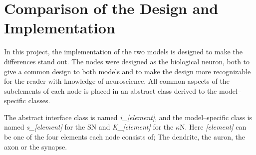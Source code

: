 






\section{Comparison of the Design and Implementation}


	In this project, the implementation of the two models is designed to make the differences stand out. %
	The nodes were designed as the biological neuron, both to give a common design to both models and to make the design more recognizable for the reader with knowledge of neuroscience.
	All common aspects of the subelements of each node is placed in an abstract class derived to the model--specific classes.

	The abstract interface class is named \emph{i\_[element]}, and the model--specific class is named \emph{s\_[element]} for the SN and \emph{K\_[element]} for the $\kappa$N.
	Here \emph{[element]} can be one of the four elements each node consists of; The dendrite, the auron, the axon or the synapse.

